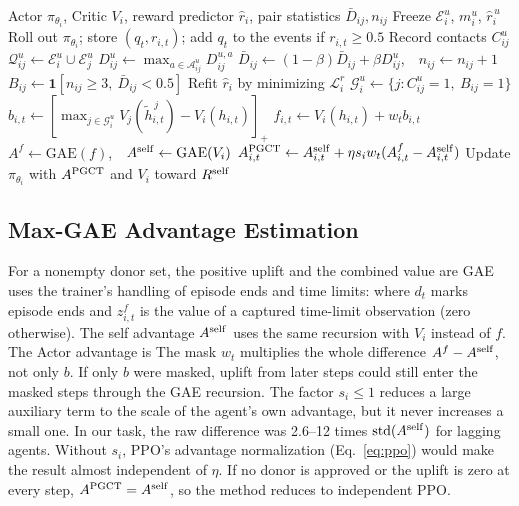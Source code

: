 \documentclass{article}
\begin{document}
\begin{algorithm}[tb]
\caption{PGCT update $u$ of agent $i$}
\label{alg:pgct}
\begin{algorithmic}[1]
\REQUIRE Actor $\pi_{\theta_i}$, Critic $V_i$, reward predictor $\widehat r_i$, pair statistics $\bar D_{ij},n_{ij}$
\STATE Freeze $\mathcal E_i^u$, $m_i^u$, $\widehat r_i^{\,u}$ 
\STATE Roll out $\pi_{\theta_i}$; store $(q_t,r_{i,t})$; add $q_t$ to the events if $r_{i,t}\ge0.5$
\STATE Record contacts $C_{ij}^u$ 
\STATE $\mathcal Q_{ij}^u\leftarrow\mathcal E_i^u\cup\mathcal E_j^u$
\STATE $D_{ij}^u\leftarrow\max_{a\in\mathcal A_{ij}^u}D_{ij}^{u,a}$ 
\STATE $\bar D_{ij}\leftarrow(1-\beta)\bar D_{ij}+\beta D_{ij}^u$,\ \ $n_{ij}\leftarrow n_{ij}+1$
\ENDIF
\STATE $B_{ij}\leftarrow\mathbf 1[n_{ij}\ge3,\ \bar D_{ij}<0.5]$ 
\ENDFOR
\STATE Refit $\widehat r_i$ by minimizing $\mathcal L_i^r$ 
\ENDIF
\STATE $\mathcal G_i^u\leftarrow\{j:C_{ij}^u=1,\ B_{ij}=1\}$
\STATE $b_{i,t}\leftarrow[\max_{j\in\mathcal G_i^u}V_j(\tilde h_{i,t}^{\,j})-V_i(h_{i,t})]_+$ 
\STATE $f_{i,t}\leftarrow V_i(h_{i,t})+w_tb_{i,t}$
\STATE $A^{f}\leftarrow\mathrm{GAE}(f)$,\ \ $A^{\rm self}\leftarrow\mathrm{GAE}(V_i)$ 
\STATE $A^{\rm PGCT}_{i,t}\leftarrow A^{\rm self}_{i,t}+\eta s_iw_t(A^f_{i,t}-A^{\rm self}_{i,t})$ 
\STATE Update $\pi_{\theta_i}$ with $A^{\rm PGCT}$ and $V_i$ toward $R^{\rm self}$ 
\end{algorithmic}
\end{algorithm}

\subsection{Max-GAE Advantage Estimation}
For a nonempty donor set, the positive uplift and the combined value are
\MaxEquation
GAE uses the trainer's handling of episode ends and time limits:
\GAEEquation
where $d_t$ marks episode ends and $z^f_{i,t}$ is the value of a captured time-limit observation (zero otherwise). The self advantage $A^{\rm self}$ uses the same recursion with $V_i$ instead of $f$. The Actor advantage is
\BlendEquation
The mask $w_t$ multiplies the whole difference $A^f-A^{\rm self}$, not only $b$. If only $b$ were masked, uplift from later steps could still enter the masked steps through the GAE recursion. The factor $s_i\le1$ reduces a large auxiliary term to the scale of the agent's own advantage, but it never increases a small one. In our task, the raw difference was 2.6--12 times $\operatorname{std}(A^{\rm self})$ for lagging agents. Without $s_i$, PPO's advantage normalization (Eq.~\ref{eq:ppo}) would make the result almost independent of $\eta$. If no donor is approved or the uplift is zero at every step, $A^{\rm PGCT}=A^{\rm self}$, so the method reduces to independent PPO.
\end{document}
